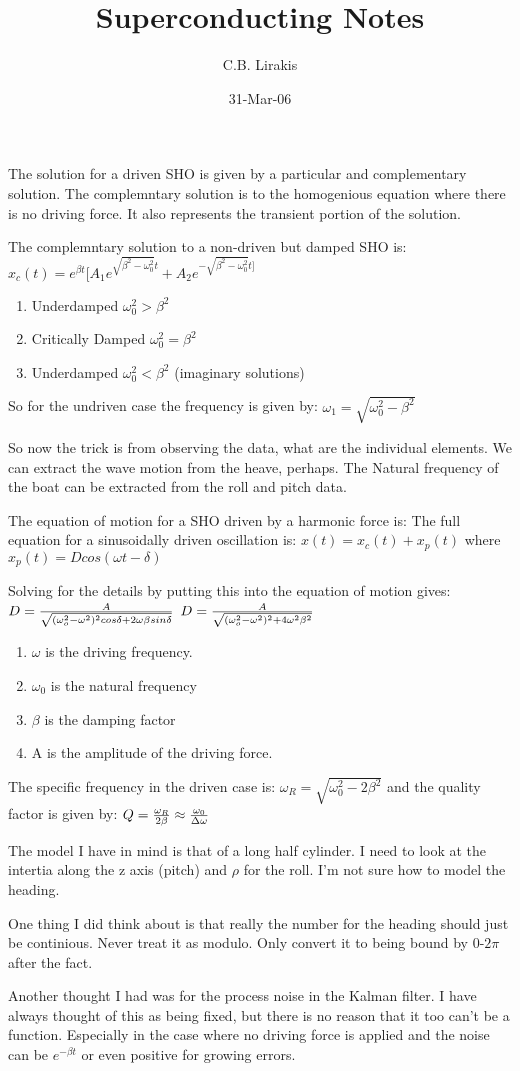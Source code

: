 \documentclass[a4paper]{book}
\title{Superconducting Notes}
\date{31-Mar-06}
\author{C.B. Lirakis}
\begin{document}
The solution for a driven SHO is given by a particular and complementary 
solution. The complemntary solution is to the homogenious equation where there
is no driving force. It also represents the transient portion of the solution.

The complemntary solution to a non-driven but damped SHO is:\hfill\break
$x_c(t) = e^{\beta t} [A_1 e^{\sqrt{\beta^2-\omega_0^2}t}+A_2 e^{-\sqrt{\beta^2-\omega_0^2}t]}$\hfill\break

\begin{enumerate}
\item Underdamped $\omega_0^2 > \beta^2$
\item Critically Damped $\omega_0^2 = \beta^2$
\item Underdamped $\omega_0^2 < \beta^2$ (imaginary solutions)
\end{enumerate}


So for the undriven case the frequency is given by: \hfill\break
$\omega_1 = \sqrt{\omega_0^2-\beta^2}$ \hfill\break

So now the trick is from observing the data, what are the individual elements. 
We can extract the wave motion from the heave, perhaps. The Natural frequency 
of the boat can be extracted from the roll and pitch data. 

The equation of motion for a SHO driven by a harmonic force is: \hfill\break
The full equation for a sinusoidally driven oscillation is: \hfill\break
$x(t) = x_c(t) + x_p(t) $
where \hfill \break
$x_p(t) = Dcos(\omega t - \delta)$

Solving for the details by putting this into the equation of motion gives: \hfill\break
$D={A\over{\sqrt{(\omega_o^2 - \omega^2)^2cos\delta+2\omega\beta sin\delta}}}$ \hfill\break
$D={A\over{\sqrt{(\omega_o^2 - \omega^2)^2+4\omega^2\beta^2}}}$\hfill\break
\begin{enumerate}
\item $\omega$ is the driving frequency.
\item $\omega_0$ is the natural frequency
\item $\beta$ is the damping factor
\item A  is the amplitude of the driving force. 
\end{enumerate}

The specific frequency in the driven case is: \hfill\break
$\omega_R = \sqrt{\omega_0^2-2\beta^2}$ \hfill\break
and the quality factor is given by: \hfill\break
$Q={\omega_R \over{2\beta}} \approx {\omega_0\over{\Delta\omega}}$


The model I have in mind is that of a long half cylinder. I need to look at 
the intertia along the z axis (pitch) and $\rho$ for the roll. I'm not sure 
how to model the heading. 

One thing I did think about is that really the number for the heading should 
just be continious. Never treat it as modulo. Only convert it to being bound 
by 0-$2\pi$ after the fact. 

Another thought I had was for the process noise in the Kalman filter. I have 
always thought of this as being fixed, but there is no reason that it too
can't be a function. Especially in the case where no driving force is applied
and the noise can be $e^{-\beta t}$ or even positive for growing errors. 
\end{document}

